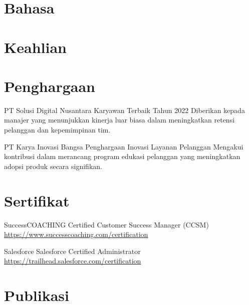 \documentclass[a4paper, serif, 10pt]{moderncv}
\begin{document}
\section{Bahasa}

\section{Keahlian}

\section{Penghargaan}

        {PT Solusi Digital Nusantara}
        {Karyawan Terbaik Tahun 2022}
        {}
        {}
        {Diberikan kepada manajer yang menunjukkan kinerja luar biasa dalam meningkatkan retensi pelanggan dan kepemimpinan tim.}

        {PT Karya Inovasi Bangsa}
        {Penghargaan Inovasi Layanan Pelanggan}
        {}
        {}
        {Mengakui kontribusi dalam merancang program edukasi pelanggan yang meningkatkan adopsi produk secara signifikan.}
\section{Sertifikat}

        {SuccessCOACHING}
        {Certified Customer Success Manager (CCSM)}
        {\url{https://www.successcoaching.com/certification}}
        {}
        {}

        {Salesforce}
        {Salesforce Certified Administrator}
        {\url{https://trailhead.salesforce.com/certification}}
        {}
        {}
\section{Publikasi}
\end{document}
